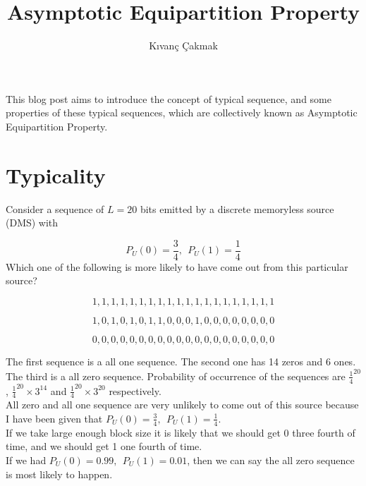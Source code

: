\documentclass[11pt]{article}
\title{\textbf{Asymptotic Equipartition Property}}
\author{K{\i}van\c{c} \c{C}akmak\\}
\date{}
\begin{document}
\maketitle

This blog post aims to introduce the concept of typical sequence, and some properties of these typical sequences, which are collectively known as Asymptotic Equipartition Property.

\section{Typicality}

Consider a sequence of $L = 20$ bits emitted by a discrete memoryless source (DMS) with

\begin{equation}
P_{U}(0) = \frac{3}{4},\:\: P_{U}(1) = \frac{1}{4}
\end{equation}
Which one of the following is more likely to have come out from this particular
source?

\begin{equation}
1,1,1,1,1,1,1,1,1,1,1,1,1,1,1,1,1,1,1,1
\end{equation}

\begin{equation}
1,0,1,0,1,0,1,1,0,0,0,1,0,0,0,0,0,0,0,0
\end{equation}

\begin{equation}
0,0,0,0,0,0,0,0,0,0,0,0,0,0,0,0,0,0,0,0
\end{equation}

The first sequence is a all one sequence. The second one has 14 zeros and
6 ones. The third is a all zero sequence. Probability of occurrence of the sequences are $\frac{1}{4}^{20}$, $\frac{1}{4}^{20}\times3^{14}$ and $\frac{1}{4}^{20}\times3^{20}$ respectively. 
\\

All zero and all one sequence are very unlikely to come out of this source
because I have been given that $P_{U}(0) = \frac{3}{4},\:\: P_{U}(1) = \frac{1}{4}$.
\\

If we take large enough block size it is likely that we should get 0 three fourth of time, and we should get 1 one fourth of time. 
\\

If we had $P_{U}(0) = 0.99,\:\: P_{U}(1) = 0.01$, then we can say the all zero sequence is most likely to happen.
\\
\end{document}

